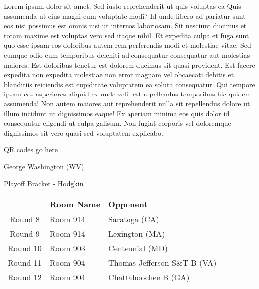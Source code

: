 \documentclass{article}%
\begin{document}
\vspace*{8pt}%
\linebreak%
\newline%
\newline%
Lorem ipsum dolor sit amet. Sed iusto reprehenderit ut quis voluptas ea Quis assumenda ut eius magni eum voluptate modi? Id unde libero ad pariatur sunt eos nisi possimus est omnis nisi ut internos laboriosam. Sit nesciunt ducimus et totam maxime est voluptas vero sed itaque nihil. Et expedita culpa et fuga sunt quo esse ipsam eos doloribus autem rem perferendis modi et molestiae vitae.\newline%
\newline%
Sed cumque odio eum temporibus deleniti ad consequatur consequatur aut molestias maiores. Est doloribus tenetur est dolorem ducimus sit quasi provident. Est facere expedita non expedita molestiae non error magnam vel obcaecati debitis et blanditiis reiciendis est cupiditate voluptatem ea soluta consequatur. Qui tempore ipsam eos asperiores aliquid ex unde velit est repellendus temporibus hic quidem assumenda!\newline%
\newline%
Non autem maiores aut reprehenderit nulla sit repellendus dolore ut illum incidunt ut dignissimos eaque! Ex aperiam minima eos quis dolor id consequatur eligendi ut culpa galisum. Non fugiat corporis vel doloremque dignissimos sit vero quasi sed voluptatem explicabo.\newline%
\newline%
%
\vspace*{30pt}%
\begin{center}%
\begin{Huge}%
QR codes go here%
\end{Huge}%
\end{center}%
\newpage%
\begin{center}%
\begin{Huge}%
George Washington (WV)%
\end{Huge}%
\vspace*{8pt}%
\linebreak%
\begin{Large}%
Playoff Bracket {-} Hodgkin%
\end{Large}%
\end{center}%
%
\begin{tabularx}{\textwidth}{|c|Y|Y|}%
\hline%
&Room Name&Opponent\\%
\hline%
Round 8&Room 914&Saratoga (CA)\\%
Round 9&Room 914&Lexington (MA)\\%
Round 10&Room 903&Centennial (MD)\\%
Round 11&Room 904&Thomas Jefferson S\&T B (VA)\\%
Round 12&Room 904&Chattahoochee B (GA)\\%
\hline%
\end{tabularx}%
\end{document}
